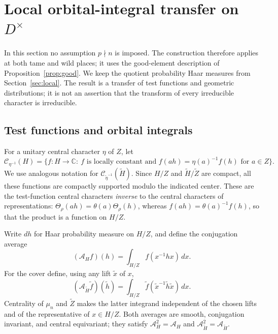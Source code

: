 \documentclass[11pt]{article}
\newcommand{\tH}{\widetilde H}
\newcommand{\tZ}{\widetilde Z}
\theoremstyle{plain}
\theoremstyle{definition}
\begin{document}
\section{Local orbital-integral transfer on \texorpdfstring{$D^\times$}{D x}}\label{sec:orbital}
In this section no assumption $p\nmid n$ is imposed. The construction therefore
applies at both tame and wild places; it uses the good-element description of
Proposition~\ref{prop:good}. We keep the quotient probability Haar measures from
Section~\ref{sec:local}. The result is a transfer of test functions and geometric
distributions; it is not an assertion that the transform of every irreducible
character is irreducible.

\subsection{Test functions and orbital integrals}
For a unitary central character $\eta$ of $Z$, let
\[
\mathcal C_{\eta^{-1}}(H)
=\{f:H\to\mathbb C:\ f\text{ is locally constant and }
                   f(ah)=\eta(a)^{-1}f(h)\text{ for }a\in Z\}.
\]
We use analogous notation for $\mathcal C_{\widetilde\eta^{-1}}(\tH)$.
Since $H/Z$ and $\tH/\tZ$ are compact, all these functions are compactly
supported modulo the indicated center. These are the test-function central
characters \emph{inverse} to the central characters of representations:
$\Theta_\rho(ah)=\theta(a)\Theta_\rho(h)$, whereas
$f(ah)=\theta(a)^{-1}f(h)$, so that the product is a function on $H/Z$.

Write $dh$ for Haar probability measure on $H/Z$, and define the
conjugation average
\begin{equation}\label{eq:avg-H}
(\mathcal A_Hf)(h)
=\int_{H/Z}f(x^{-1}hx)\,dx.
\end{equation}
For the cover define, using any lift $\widetilde x$ of $x$,
\begin{equation}\label{eq:avg-cover}
(\mathcal A_{\tH}\widetilde f)(\widetilde h)
=\int_{H/Z}\widetilde f(\widetilde x^{-1}\widetilde h\widetilde x)\,dx.
\end{equation}
Centrality of $\mu_n$ and $\tZ$ makes the latter integrand independent of
the chosen lifts and of the representative of $x\in H/Z$. Both averages
are smooth, conjugation invariant, and central equivariant; they satisfy
$\mathcal A_H^2=\mathcal A_H$ and
$\mathcal A_{\tH}^2=\mathcal A_{\tH}$.
\end{document}
